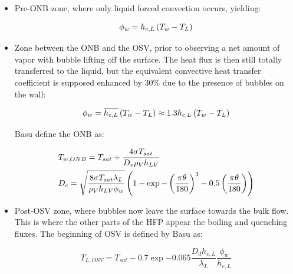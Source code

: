 \begin{itemize}
\item Pre-ONB zone, where only liquid forced convection occurs, yielding:

\begin{equation}
\phi_{w}=h_{c,L} \left( T_{w}-T_{L} \right)
\label{eq:HFP_B_preONB}
\end{equation}

\item Zone between the ONB and the OSV, prior to observing a net amount of vapor with bubble lifting off the surface. The heat flux is then still totally transferred to the liquid, but the equivalent convective heat transfer coefficient is supposed enhanced by 30\% due to the presence of bubbles on the wall:

\begin{equation}
\phi_{w}=\overline{h_{c,L}} \left( T_{w}-T_{L} \right)\approx 1.3 h_{c,L}\left( T_{w}-T_{L} \right)
\label{eq:HFP_B_postONB}
\end{equation}

Basu \etal define the ONB as:

\begin{align}
&T_{w, ONB}= T_{sat} + \frac{4 \sigma T_{sat}}{D_{v}\rho_{V} h_{LV}}\\
&D_{c}= \sqrt{\frac{8 \sigma T_{sat} \lambda_{L}}{\rho_{V} h_{LV} \phi_{w}}}\left(  1- \exp{ -\left( \frac{\pi \theta}{180} \right)^{3} - 0.5 \left( \frac{\pi \theta}{180} \right)  }  \right)
\label{eq:HFP_B_ONB}
\end{align}

\item Post-OSV zone, where bubbles now leave the surface towards the bulk flow. This is where the other parts of the HFP appear \ie the boiling and quenching fluxes. The beginning of OSV is defined by Basu \etal as:

\begin{equation}
T_{L,OSV}=T_{sat}-0.7\exp{-0.065 \frac{D_{d}h_{c,L}}{\lambda_{L}}}\frac{\phi_{w}}{h_{c,L}}
\end{equation}

\end{itemize}


